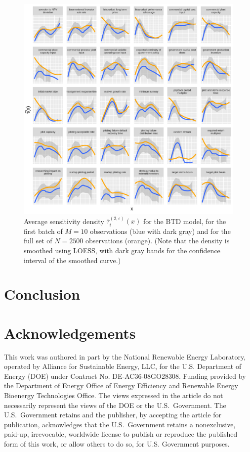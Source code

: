 \documentclass[12pt]{article}
\begin{document}
\begin{figure}
    \centering
    \includegraphics[width=\linewidth]{figures/btd-taubar1.png}
    \caption{Average sensitivity density $\overline{\tau}_i^{(2,\epsilon)}(x)$ for the BTD model, for the first batch of $M = 10$ observations (blue with dark gray) and for the full set of $N = 2500$ observations (orange). (Note that the density is smoothed using LOESS, with dark gray bands for the confidence interval of the smoothed curve.)}
    \label{fig:btd-taubar1}
\end{figure}


\section{Conclusion}



\section*{Acknowledgements}

This work was authored in part by the National Renewable Energy Laboratory, operated by Alliance for Sustainable Energy, LLC, for the U.S. Department of Energy (DOE) under Contract No. DE-AC36-08GO28308. Funding provided by the Department of Energy Office of Energy Efficiency and Renewable Energy Bioenergy Technologies Office. The views expressed in the article do not necessarily represent the views of the DOE or the U.S.\ Government. The U.S.\ Government retains and the publisher, by accepting the article for publication, acknowledges that the U.S.\ Government retains a nonexclusive, paid-up, irrevocable, worldwide license to publish or reproduce the published form of this work, or allow others to do so, for U.S. Government purposes.
\end{document}
